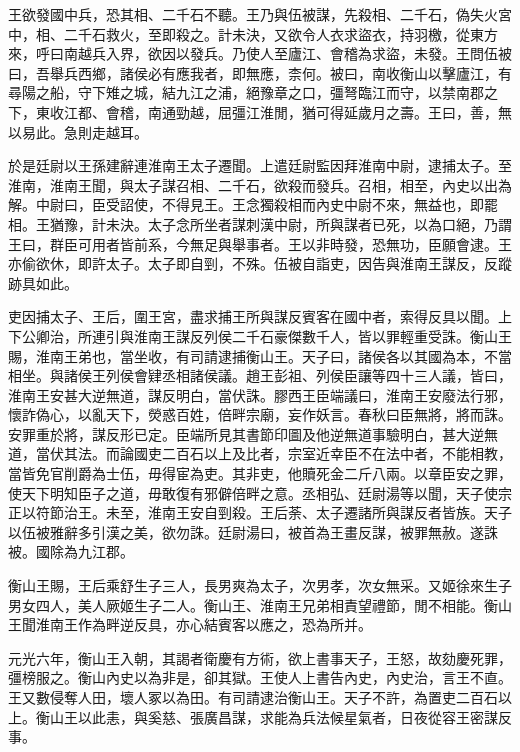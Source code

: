 王欲發國中兵，恐其相、二千石不聽。王乃與伍被謀，先殺相、二千石，偽失火宮中，相、二千石救火，至即殺之。計未決，又欲令人衣求盜衣，持羽檄，從東方來，呼曰南越兵入界，欲因以發兵。乃使人至廬江、會稽為求盜，未發。王問伍被曰，吾舉兵西鄉，諸侯必有應我者，即無應，柰何。被曰，南收衡山以擊廬江，有尋陽之船，守下雉之城，結九江之浦，絕豫章之口，彊弩臨江而守，以禁南郡之下，東收江都、會稽，南通勁越，屈彊江淮閒，猶可得延歲月之壽。王曰，善，無以易此。急則走越耳。

於是廷尉以王孫建辭連淮南王太子遷聞。上遣廷尉監因拜淮南中尉，逮捕太子。至淮南，淮南王聞，與太子謀召相、二千石，欲殺而發兵。召相，相至，內史以出為解。中尉曰，臣受詔使，不得見王。王念獨殺相而內史中尉不來，無益也，即罷相。王猶豫，計未決。太子念所坐者謀刺漢中尉，所與謀者已死，以為口絕，乃謂王曰，群臣可用者皆前系，今無足與舉事者。王以非時發，恐無功，臣願會逮。王亦偷欲休，即許太子。太子即自剄，不殊。伍被自詣吏，因告與淮南王謀反，反蹤跡具如此。

吏因捕太子、王后，圍王宮，盡求捕王所與謀反賓客在國中者，索得反具以聞。上下公卿治，所連引與淮南王謀反列侯二千石豪傑數千人，皆以罪輕重受誅。衡山王賜，淮南王弟也，當坐收，有司請逮捕衡山王。天子曰，諸侯各以其國為本，不當相坐。與諸侯王列侯會肄丞相諸侯議。趙王彭祖、列侯臣讓等四十三人議，皆曰，淮南王安甚大逆無道，謀反明白，當伏誅。膠西王臣端議曰，淮南王安廢法行邪，懷詐偽心，以亂天下，熒惑百姓，倍畔宗廟，妄作妖言。春秋曰臣無將，將而誅。安罪重於將，謀反形已定。臣端所見其書節印圖及他逆無道事驗明白，甚大逆無道，當伏其法。而論國吏二百石以上及比者，宗室近幸臣不在法中者，不能相教，當皆免官削爵為士伍，毋得宦為吏。其非吏，他贖死金二斤八兩。以章臣安之罪，使天下明知臣子之道，毋敢復有邪僻倍畔之意。丞相弘、廷尉湯等以聞，天子使宗正以符節治王。未至，淮南王安自剄殺。王后荼、太子遷諸所與謀反者皆族。天子以伍被雅辭多引漢之美，欲勿誅。廷尉湯曰，被首為王畫反謀，被罪無赦。遂誅被。國除為九江郡。

衡山王賜，王后乘舒生子三人，長男爽為太子，次男孝，次女無采。又姬徐來生子男女四人，美人厥姬生子二人。衡山王、淮南王兄弟相責望禮節，閒不相能。衡山王聞淮南王作為畔逆反具，亦心結賓客以應之，恐為所并。

元光六年，衡山王入朝，其謁者衛慶有方術，欲上書事天子，王怒，故劾慶死罪，彊榜服之。衡山內史以為非是，卻其獄。王使人上書告內史，內史治，言王不直。王又數侵奪人田，壞人冢以為田。有司請逮治衡山王。天子不許，為置吏二百石以上。衡山王以此恚，與奚慈、張廣昌謀，求能為兵法候星氣者，日夜從容王密謀反事。

